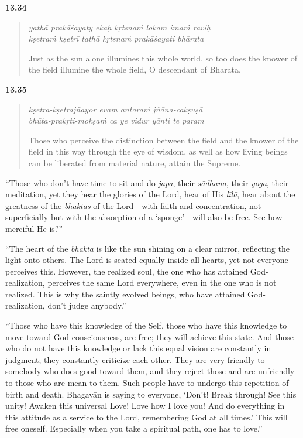 \par\noindent\textbf{13.34}\par
\begin{verse}
\textit{yathā prakāśayaty ekaḥ kṛtsnaṁ lokam imaṁ raviḥ} \\
\textit{kṣetraṁ kṣetrī tathā kṛtsnaṁ prakāśayati bhārata}

\noindent Just as the sun alone illumines this whole world, so too does the knower of the field illumine the whole field, O descendant of Bharata.
\end{verse}
\par



\par\noindent\textbf{13.35}\par
\begin{verse}
\textit{kṣetra-kṣetrajñayor evam antaraṁ jñāna-cakṣuṣā} \\
\textit{bhūta-prakṛti-mokṣaṁ ca ye vidur yānti te param}

\noindent Those who perceive the distinction between the field and the knower of the field in this way through the eye of wisdom, as well as how living beings can be liberated from material nature, attain the Supreme.
\end{verse}
\par


\enquote{Those who don’t have time to sit and do \textit{japa}, their \textit{sādhana}, their \textit{yoga}, their meditation, yet they hear the glories of the Lord, hear of His \textit{līlā}, hear about the greatness of the \textit{bhaktas} of the Lord---with faith and concentration, not superficially but with the absorption of a \enquote{sponge}---will also be free. See how merciful He is?}

\enquote{The heart of the \textit{bhakta} is like the sun shining on a clear mirror, reflecting the light onto others. The Lord is seated equally inside all hearts, yet not everyone perceives this. However, the realized soul, the one who has attained God-realization, perceives the same Lord everywhere, even in the one who is not realized. This is why the saintly evolved beings, who have attained God-realization, don’t judge anybody.}

\enquote{Those who have this knowledge of the Self, those who have this knowledge to move toward God consciousness, are free; they will achieve this state. And those who do not have this knowledge or lack this equal vision are constantly in judgment; they constantly criticize each other. They are very friendly to somebody who does good toward them, and they reject those and are unfriendly to those who are mean to them. Such people have to undergo this repetition of birth and death. Bhagavān is saying to everyone, \enquote{Don’t! Break through! See this unity! Awaken this universal Love! Love how I love you! And do everything in this attitude as a service to the Lord, remembering God at all times.} This will free oneself. Especially when you take a spiritual path, one has to love.}

